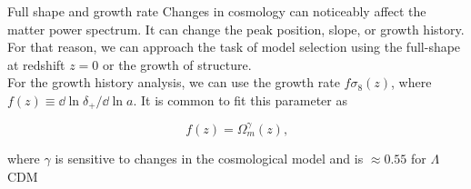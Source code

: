 \begin{block}{Full shape and growth rate}
Changes in cosmology can noticeably affect the matter power spectrum. It can change the peak position, slope, or growth history. For that reason, we can approach the task of model selection using the full-shape at redshift $z=0$ or the growth of structure.\\

For the growth history analysis, we can use the growth rate $f\sigma_{8}(z)$, where $f(z) \equiv \dd{\ln\delta_+}/\dd{\ln{a}}$. It is common to fit this parameter as

\begin{equation}
  f(z) = \Omega_m^\gamma(z)\text{,}
\end{equation}

where $\gamma$ is sensitive to changes in the cosmological model and is $\approx 0.55$ for $\Lambda$CDM\\


\end{block}
